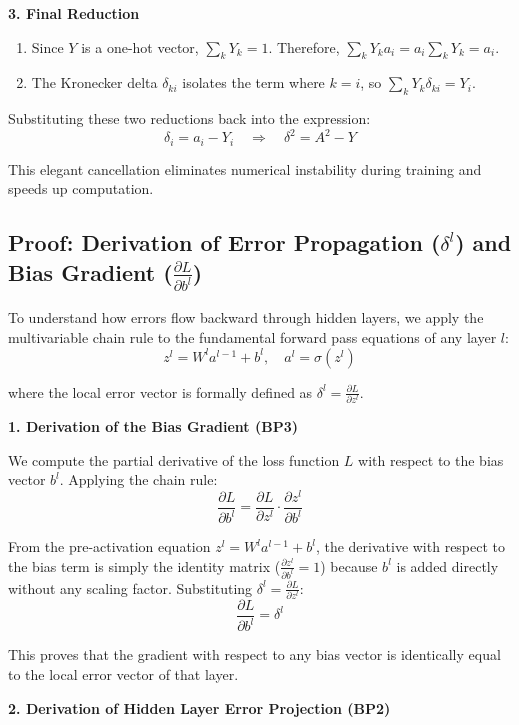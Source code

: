 \documentclass[11pt]{article}
\begin{document}
\textbf{3. Final Reduction}

\begin{enumerate}
    \item Since $Y$ is a one-hot vector, $\sum_k Y_k = 1$. Therefore, $\sum_k Y_k a_i = a_i \sum_k Y_k = a_i$.
    \item The Kronecker delta $\delta_{ki}$ isolates the term where $k=i$, so $\sum_k Y_k \delta_{ki} = Y_i$.
\end{enumerate}

Substituting these two reductions back into the expression:
\[
\delta_i = a_i - Y_i \quad\Longrightarrow\quad \boxed{\delta^2 = A^2 - Y}
\]

This elegant cancellation eliminates numerical instability during training and speeds up computation.

\subsection{Proof: Derivation of Error Propagation (\texorpdfstring{$\delta^l$}{delta l}) and Bias Gradient (\texorpdfstring{$\frac{\partial L}{\partial b^l}$}{dL/db l})}

To understand how errors flow backward through hidden layers, we apply the multivariable chain rule to the fundamental forward pass equations of any layer $l$:
$$ z^l = W^la^{l-1} + b^l,\quad a^l = \sigma(z^l)$$

where the local error vector is formally defined as $\delta^l = \frac{\partial L}{\partial z^l}$.

\textbf{1. Derivation of the Bias Gradient (BP3)}

We compute the partial derivative of the loss function $L$ with respect to the bias vector $b^l$. Applying the chain rule:
\[
\frac{\partial L}{\partial b^l} = \frac{\partial L}{\partial z^l}\cdot\frac{\partial z^l}{\partial b^l}
\]

From the pre-activation equation $z^l = W^l a^{l-1} + b^l$, the derivative with respect to the bias term is simply the identity matrix ($\frac{\partial z^l}{\partial b^l} = 1$) because $b^l$ is added directly without any scaling factor. Substituting $\delta^l = \frac{\partial L}{\partial z^l}$:
\[
\boxed{\frac{\partial L}{\partial b^l} = \delta^l}
\]

This proves that the gradient with respect to any bias vector is identically equal to the local error vector of that layer.

\textbf{2. Derivation of Hidden Layer Error Projection (BP2)}
\end{document}
